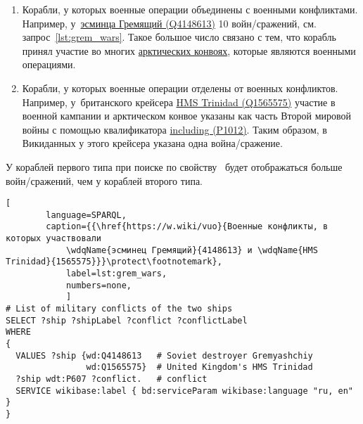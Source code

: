 \begin{enumerate}
  \item Корабли, у которых военные операции объединены с военными конфликтами. 
      Например, у~\href{https://www.wikidata.org/wiki/Q4148613}{эсминца Гремящий (Q4148613)} 10 войн/сражений, 
        см. запрос~\ref{lst:grem_wars}. 
        Такое большое число связано с тем, 
        что корабль принял участие во многих 
        \href{https://ru.wikipedia.org/wiki/Арктические_конвои}{арктических конвоях}, 
        которые являются военными операциями.
  \item Корабли, у которых военные операции отделены от военных конфликтов. 
      Например, у~британского крейсера 
        \href{https://www.wikidata.org/wiki/Q1565575}{HMS Trinidad (Q1565575)} 
        участие в военной кампании и арктическом конвое указаны как часть Второй мировой войны 
        с помощью квалификатора 
        \href{https://www.wikidata.org/wiki/Property:P1012}{including (P1012)}. 
        Таким образом, в Викиданных у этого крейсера указана одна война/сра\-жение.
\end{enumerate}

У кораблей первого типа при поиске по свойству~ будет отображаться больше войн/сражений, чем у кораблей второго типа. 


\begin{lstlisting}[ 
        language=SPARQL, 
        caption={{\href{https://w.wiki/vuo}{Военные конфликты, в которых участвовали 
            \wdqName{эсминец Гремящий}{4148613} и \wdqName{HMS Trinidad}{1565575}}}\protect\footnotemark}, 
            label=lst:grem_wars, 
            numbers=none,
            ]
# List of military conflicts of the two ships 
SELECT ?ship ?shipLabel ?conflict ?conflictLabel
WHERE
{
  VALUES ?ship {wd:Q4148613   # Soviet destroyer Gremyashchiy
                wd:Q1565575}  # United Kingdom's HMS Trinidad
  ?ship wdt:P607 ?conflict.   # conflict
  SERVICE wikibase:label { bd:serviceParam wikibase:language "ru, en" }
}
\end{lstlisting}





